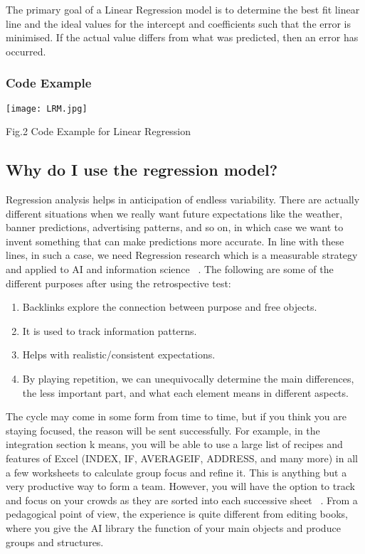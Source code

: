 \documentclass[10pt]{aa}
\begin{document}
The primary goal of a Linear Regression model is to determine the best fit linear line and the ideal values for the intercept and coefficients such that the error is minimised. If the actual value differs from what was predicted, then an error has occurred.

\subsubsection{Code Example}

\texttt{[image: LRM.jpg]}
\caption{Fig.2 Code Example for Linear Regression}
\label{FigVibStab}


\subsection{Why do I use the regression model?}
Regression analysis helps in anticipation of endless variability. There are actually different situations when we really want future expectations like the weather, banner predictions, advertising patterns, and so on, in which case we want to invent something that can make predictions more accurate. In line with these lines, in such a case, we need Regression research which is a measurable strategy and applied to AI and information science ~\cite{hart_2021_machine}. The following are some of the different purposes after using the retrospective test:
    \begin{enumerate}
        \item Backlinks explore the connection between purpose and free objects.
        \item It is used to track information patterns.
        \item Helps with realistic/consistent expectations.
        \item By playing repetition, we can unequivocally determine the main differences, the less important part, and what each element means in different aspects.
   \end{enumerate}
The cycle may come in some form from time to time, but if you think you are staying focused, the reason will be sent successfully. For example, in the integration section k means, you will be able to use a large list of recipes and features of Excel (INDEX, IF, AVERAGEIF, ADDRESS, and many more) in all a few worksheets to calculate group focus and refine it. This is anything but a very productive way to form a team. However, you will have the option to track and focus on your crowds as they are sorted into each successive sheet ~\cite{vonlilienfeld_2020_retrospective}. From a pedagogical point of view, the experience is quite different from editing books, where you give the AI library the function of your main objects and produce groups and structures.
\end{document}
